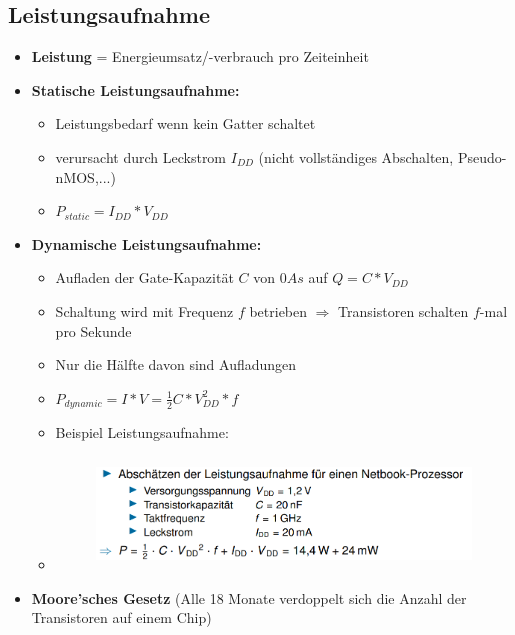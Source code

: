 \documentclass[11pt,a4paper]{article}
\begin{document}
\subsection{Leistungsaufnahme}
\begin{itemize}
\item \textbf{Leistung} = Energieumsatz/-verbrauch pro Zeiteinheit

\item \textbf{Statische Leistungsaufnahme:} 
	\begin{itemize}
	\item Leistungsbedarf wenn kein Gatter schaltet
	\item verursacht durch Leckstrom $I_{DD}$ (nicht vollständiges Abschalten, Pseudo-nMOS,...)
	\item $P_{static} = I_{DD} * V_{DD}$
	\end{itemize}

\item \textbf{Dynamische Leistungsaufnahme:} 
	\begin{itemize}
	\item Aufladen der Gate-Kapazität $C$ von $0 As$ auf $Q = C * V_{DD}$
	\item Schaltung wird mit Frequenz $f$ betrieben $\Rightarrow$ Transistoren schalten $f$-mal pro Sekunde
	\item Nur die Hälfte davon sind Aufladungen
	\item $P_{dynamic} = I * V = \frac{1}{2} C*V_{DD}^2*f$
	\item Beispiel Leistungsaufnahme:
	\item[]	\vspace{-0.35cm}
			\begin{figure}[H]
				\begin{center}
				\includegraphics[height=3cm]{bspleistung}
				\end{center}
			\end{figure}
	\end{itemize}
	
\item \textbf{Moore'sches Gesetz} (Alle 18 Monate verdoppelt sich die Anzahl der Transistoren auf einem Chip)
	
	
\end{itemize}
\end{document}
